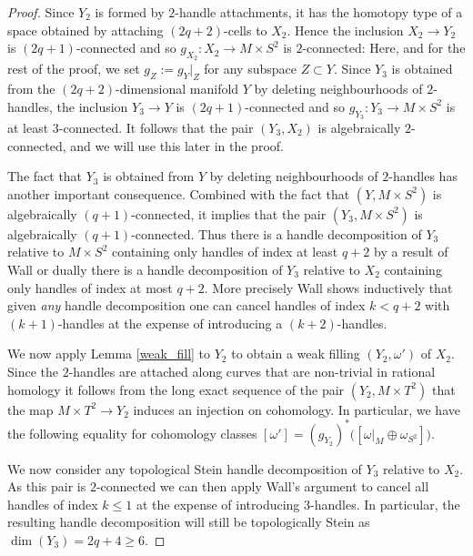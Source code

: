 \documentclass[12pt]{amsart}
\theoremstyle{remark}
\begin{document}
\begin{proof}
Since $Y_2$ is formed by $2$-handle attachments, 
it has the homotopy type of a space obtained by attaching $(2q{+}2)$-cells to $X_2$.
Hence the inclusion $X_2 \to Y_2$ is $(2q{+}1)$-connected and so 
$g_{X_2} \colon X_2 \to M \times S^2$ is $2$-connected:
Here, and for the rest of the proof, we set $g_Z := g_Y|_Z$ for any subspace $Z \subset Y$.
Since $Y_3$ is obtained from the $(2q{+}2)$-dimensional manifold $Y$ by deleting neighbourhoods of $2$-handles,
the inclusion $Y_3 \to Y$ is $(2q{+}1)$-connected and so 
$g_{Y_3} \colon Y_3 \to M \times S^2$ is at least $3$-connected.
It follows that the pair $(Y_3,X_2)$ is algebraically $2$-connected,
and we will use this later in the proof.

The fact that $Y_3$ is obtained from $Y$ by deleting 
neighbourhoods of $2$-handles has another important consequence.
Combined with the fact that $(Y, M \times S^2)$ is algebraically $(q{+}1)$-connected,
it implies that the pair $(Y_3,M \times S^2)$ is algebraically $(q{+}1)$-connected. 
Thus there is a handle decomposition of $Y_3$ relative to $M \times S^2$ containing only handles of index at least $q{+}2$ by a result of Wall \cite[Theorem 2.18]{BCS2} or dually there is a handle decomposition of $Y_3$ relative to $X_2$ containing only handles of index at most $q{+}2$. More precisely Wall shows inductively that given \emph{any} handle decomposition one can cancel handles of index $k < q{+}2$ with $(k{+}1)$-handles at the expense of introducing a $(k{+}2)$-handles. 

We now apply Lemma \ref{weak_fill} to $Y_2$ to obtain a weak filling $(Y_2,\omega')$ of $X_2$. Since the $2$-handles are attached along curves that are non-trivial in rational homology it follows from the long exact sequence of the pair $(Y_2, M \times T^2)$
that the map $M \times T^2 \to Y_2$ induces an injection on cohomology. In particular, we have the following equality for cohomology classes 
$[\omega'] = (g_{Y_2})^*\bigl( [\omega|_M \oplus \omega_{S^2}] \bigr)$. %

We now consider any topological Stein handle decomposition of $Y_3$ relative to $X_2$. As this pair is $2$-connected we can then apply Wall's argument to cancel all handles of index $k \le 1$ at the expense of introducing $3$-handles. In particular, the resulting handle decomposition will still be topologically Stein as $\dim(Y_3) = 2q{+}4 \ge 6$.


\end{proof}
\end{document}
